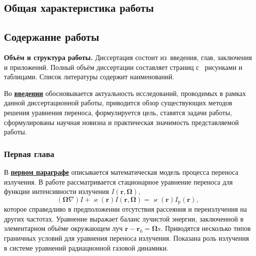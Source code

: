 \subsection*{Общая характеристика работы}


\newcommand{\contribution}{{\textbf{Личный вклад автора в публикации с соавторами.}}}


\newcommand{\epar}[1]{\underline{\textbf{#1}}}

\subsection*{Содержание работы}
\textbf{Объём и структура работы.} Диссертация состоит из~введения,  глав, заключения и  приложений. Полный объём диссертации составляет  страниц
с~ рисунками и  таблицами. Список литературы содержит  наименований.

Во \epar{введении} обосновывается актуальность исследований, проводимых в рамках данной диссертационной работы, приводится обзор существующих методов решения уравнения переноса, формулируется цель, ставятся задачи работы, сформулированы научная новизна и практическая значимость представляемой работы.


\subsubsection*{Первая глава}
В \epar{первом параграфе} описывается математическая модель процесса переноса излучения. 
В работе рассматривается стационарное уравнение переноса для функции интенсивности излучения
$I(\mathbf r, \boldsymbol \Omega)$, 
\[
(\boldsymbol \Omega  \nabla) I + \varkappa(\mathbf r) I(\mathbf r, \boldsymbol \Omega) = \varkappa(\mathbf r) I_\text{p}(\mathbf r),
\]
которое справедливо в предположении отсутствия рассеяния и переизлучения на других частотах. Уравнение выражает баланс лучистой энергии, заключенной в элементарном объёме окружающем луч $\mathbf r - \mathbf r_0 = \boldsymbol \Omega s$. Приводятся несколько типов граничных условий для уравнения переноса излучения. Показана роль излучения в системе уравнений радиационной газовой динамики. 

